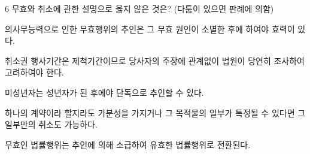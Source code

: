\begin{question}{6}
무효와 취소에 관한 설명으로 옳지 않은 것은? (다툼이 있으면 판례에 의함)
\begin{choices}
  \item 의사무능력으로 인한 무효행위의 추인은 그 무효 원인이 소멸한 후에 하여야 효력이 있다.
  \item 취소권 행사기간은 제척기간이므로 당사자의 주장에 관계없이 법원이 당연히 조사하여 고려하여야 한다.
  \item 미성년자는 성년자가 된 후에야 단독으로 추인할 수 있다.
  \item 하나의 계약이라 할지라도 가분성을 가지거나 그 목적물의 일부가 특정될 수 있다면 그 일부만의 취소도 가능하다.
  \item 무효인 법률행위는 추인에 의해 소급하여 유효한 법률행위로 전환된다.
\end{choices}
\end{question}
